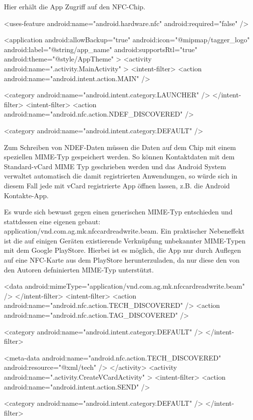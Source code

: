 \documentclass[a4paper,ngerman,12pt]{report}
\begin{document}
Hier erhält die App Zugriff auf den NFC-Chip. \begin{DoxyVerb}    <uses-feature
        android:name="android.hardware.nfc"
        android:required="false" />

    <application
        android:allowBackup="true"
        android:icon="@mipmap/tagger_logo"
        android:label="@string/app_name"
        android:supportsRtl="true"
        android:theme="@style/AppTheme" >
        <activity android:name=".activity.MainActivity" >
            <intent-filter>
                <action android:name="android.intent.action.MAIN" />

                <category android:name="android.intent.category.LAUNCHER" />
            </intent-filter>
            <intent-filter>
                <action android:name="android.nfc.action.NDEF_DISCOVERED" />

                <category android:name="android.intent.category.DEFAULT" />
\end{DoxyVerb}


Zum Schreiben von NDEF-Daten müssen die Daten auf dem Chip mit einem speziellen MIME-Typ gespeichert werden. So können Kontaktdaten mit dem Standard-vCard MIME Typ geschrieben werden und das Android System verwaltet automatisch die damit registrierten Anwendungen, so würde sich in diesem Fall jede mit vCard registrierte App öffnen lassen, z.B. die Android Kontakte-App.

Es wurde sich bewusst gegen einen generischen MIME-Typ entschieden und stattdessen eine eigenen gebaut:  application/vnd.com.ag.mk.nfccardreadwrite.beam. Ein praktischer Nebeneffekt ist die auf einigen Geräten existierende Verknüpfung unbekannter MIME-Typen mit dem Google PlayStore. Hierbei ist es möglich, die App nur durch Auflegen auf eine NFC-Karte aus dem PlayStore herunterzuladen, da nur diese den von den Autoren defninierten MIME-Typ unterstützt. \begin{DoxyVerb}                <data android:mimeType="application/vnd.com.ag.mk.nfccardreadwrite.beam" />
            </intent-filter>
            <intent-filter>
                <action android:name="android.nfc.action.TECH_DISCOVERED" />
                <action android:name="android.nfc.action.TAG_DISCOVERED" />

                <category android:name="android.intent.category.DEFAULT" />
            </intent-filter>

            <meta-data
                android:name="android.nfc.action.TECH_DISCOVERED"
                android:resource="@xml/tech" />
        </activity>
        <activity android:name=".activity.CreateVCardActivity" >
            <intent-filter>
                <action android:name="android.intent.action.SEND" />

                <category android:name="android.intent.category.DEFAULT" />
            </intent-filter>
\end{DoxyVerb}
\end{document}
